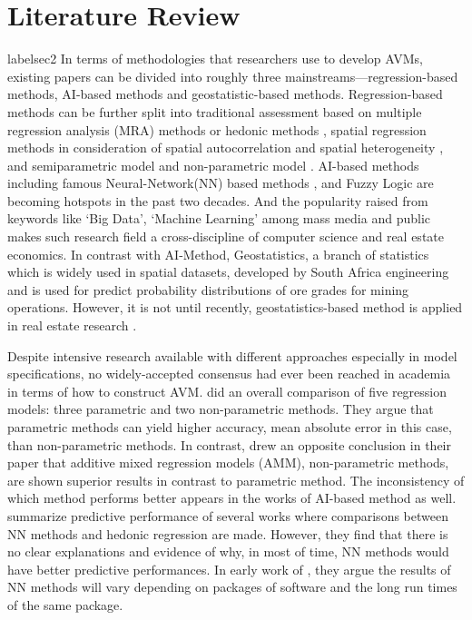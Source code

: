 \documentclass[a4paper, 12pt]{article} %
\begin{document}
\section{Literature Review}
label{sec2}
In terms of methodologies that researchers use to develop AVMs, existing papers can be divided into roughly three mainstreams—regression-based methods, AI-based methods \citep{zurada2011comparison} and geostatistic-based methods. Regression-based methods can be further split into traditional assessment based on multiple regression analysis (MRA) methods or hedonic methods \citep{adair1988application, mark1988multiple, do1992neural, garrod1992valuing, faishal2005automated}, spatial regression methods in consideration of spatial autocorrelation \citep{anselin1990some, kelejian1998suggested} and spatial heterogeneity \citep{fotheringham2003geographically, fotheringham2015geographical}, and semiparametric model \citep{robinson1988root, anglin1996semiparametric, clapp2002predicting, fan2018local} and non-parametric model \citep{mcmillen2010estimation}. AI-based methods including famous Neural-Network(NN) based methods \citep{do1992neural, tay1992artificial, worzala1995exploration, mccluskey1996mass, borst1997evaluation, rossini1999accuracy, limsombunchai2004house, garcia2008ann+, peterson2009neural, mccluskey2012potential}, and Fuzzy Logic \citep{bagnoli1998theory, aurelio2006mass,guan2008adaptive} are becoming hotspots in the past two decades. And the popularity raised from keywords like ‘Big Data’, ‘Machine Learning’ among mass media and public makes such research field a cross-discipline of computer science and real estate economics. In contrast with AI-Method, Geostatistics, a branch of statistics which is widely used in spatial datasets, developed by South Africa engineering \citet{krige1951statistical} and is used for predict probability distributions of ore grades for mining operations. However, it is not until recently, geostatistics-based method is applied in real estate research \citep{kuntz2014geostatistical}.  

Despite intensive research available with different approaches especially in model specifications, no widely-accepted consensus had ever been reached in academia in terms of how to construct AVM. \citet{crone1992estimating} did an overall comparison of five regression models: three parametric and two non-parametric methods. They argue that parametric methods can yield higher accuracy, mean absolute error in this case, than non-parametric methods. In contrast, \citet{brunauer2010additive} drew an opposite conclusion in their paper that additive mixed regression models (AMM), non-parametric methods, are shown superior results in contrast to parametric method. The inconsistency of which method performs better appears in the works of AI-based method as well. \citet{mccluskey2012potential} summarize predictive performance of several works where comparisons between NN methods and hedonic regression are made. However, they find that there is no clear explanations and evidence of why, in most of time, NN methods would have better predictive performances. In early work of \citet{worzala1995exploration}, they argue the results of NN methods will vary depending on packages of software and the long run times of the same package.
\end{document}
